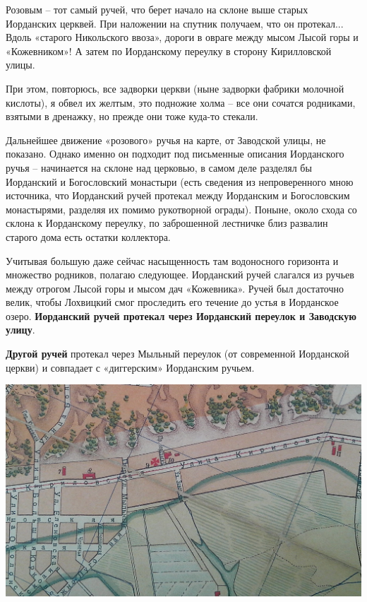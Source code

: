 Розовым – тот самый ручей, что берет начало на склоне выше старых Иорданских церквей. При наложении на спутник получаем, что он протекал... Вдоль «старого Никольского ввоза», дороги в овраге между мысом Лысой горы и «Кожевником»! А затем по Иорданскому переулку в сторону Кирилловской улицы.

При этом, повторюсь, все задворки церкви (ныне задворки фабрики молочной кислоты), я обвел их желтым, это подножие холма – все они сочатся родниками, взятыми в дренажку, но прежде они тоже куда-то стекали.

Дальнейшее движение «розового» ручья на карте, от Заводской улицы, не показано. Однако именно он подходит под письменные описания Иорданского ручья – начинается на склоне над церковью, в самом деле разделял бы Иорданский и Богословский монастыри (есть сведения из непроверенного мною источника, что Иорданский ручей протекал между Иорданским и Богословским монастырями, разделяя их помимо рукотворной ограды). Поныне, около схода со склона к Иорданскому переулку, по заброшенной лестничке близ развалин старого дома есть остатки коллектора.

Учитывая большую даже сейчас насыщенность там водоносного горизонта и множество родников, полагаю следующее. Иорданский ручей слагался из ручьев между отрогом Лысой горы и мысом дач «Кожевника». Ручей был достаточно велик, чтобы Лохвицкий смог проследить его течение до устья в Иорданское озеро. \textbf{Иорданский ручей протекал через Иорданский переулок и Заводскую улицу}.

\textbf{Другой ручей} протекал через Мыльный переулок (от современной Иорданской церкви) и совпадает с «диггерским» Иорданским ручьем.

\begin{center}
\includegraphics[width=\linewidth]{chast-kirvys/iordanruch/map-1903.jpg}
\end{center}

